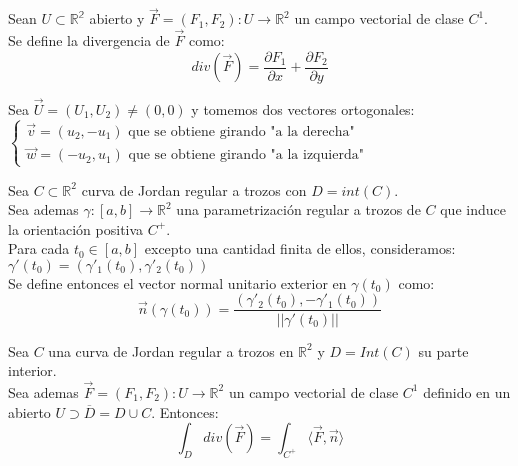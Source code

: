 \begin{definición}
    Sean $U \subset \mathbb{R^2}$ abierto y $\vec{F}=(F_1, F_2) : U \to \mathbb{R}^2$ un campo vectorial de clase $C^1$.\\
    Se define la divergencia de $\vec{F}$ como:\\
    $$ div(\vec{F}) = \frac{\partial F_1}{\partial x} + \frac{\partial F_2}{\partial y}$$
\end{definición}

\begin{observación}
    Sea $\vec{U}=(U_1, U_2) \neq (0,0)$ y tomemos dos vectores ortogonales:\\
    $ \begin{cases}
        \vec{v} = (u_2, -u_1) \text{ que se obtiene girando "a la derecha" } \\
        \vec{w} = (-u_2, u_1) \text{ que se obtiene girando "a la izquierda" }
    \end{cases}$
\end{observación}

\begin{definición}
    Sea $C \subset \mathbb{R}^2$ curva de Jordan regular a trozos con $D=int(C)$.\\
    Sea ademas $\gamma: [a,b] \to \mathbb{R}^2$ una parametrización regular a trozos de $C$ que induce la orientación positiva $C^+$.\\
    Para cada $t_0 \in [a,b]$ excepto una cantidad finita de ellos, consideramos: $\gamma'(t_0) = \left( \gamma'_1(t_0), \gamma'_2(t_0) \right)$\\
    Se define entonces el vector normal unitario exterior en $\gamma(t_0)$ como:
    $$\vec{n}(\gamma(t_0)) = \frac{ \left( \gamma'_2(t_0), -\gamma'_1(t_0) \right)}{||\gamma'(t_0)||}$$
\end{definición}

\begin{teorema}
    Sea $C$ una curva de Jordan regular a trozos en $\mathbb{R}^2$ y $D = Int(C)$ su parte interior.\\
    Sea ademas $\vec{F} = (F_1, F_2) : U \to \mathbb{R}^2$ un campo vectorial de clase $C^1$ definido en un abierto $U \supset \overline{D} = D \cup C$. Entonces:
    $$\int_D div(\vec{F}) = \int_{C^+} \langle \vec{F}, \vec{n} \rangle$$
\end{teorema}

